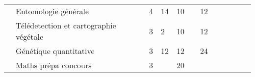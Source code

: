 \begin{tabular}{c|m{4.5cm}|cm{0.75cm}|cm{0.75cm}|cm{0.75cm}|cm{0.75cm}|cm{0.75cm}|}
 & \color{black} Entomologie générale & \color{black} 4 & \color{black} 14 & \color{black} 10 &  & \color{black} 12 
\\ 
\cline{2-7}
 & \cellcolor{couleurClaire} \color{couleurTexte} Télédetection et cartographie végétale & \cellcolor{couleurClaire} \color{couleurTexte} 3 & \cellcolor{couleurClaire} \color{couleurTexte} 2 & \cellcolor{couleurClaire} \color{couleurTexte} 10 &\cellcolor{couleurClaire} &\cellcolor{couleurClaire} \color{couleurTexte} 12 \\ \cline{2-7} 
 & \color{black} Génétique quantitative & \color{black} 3 & \color{black} 12 & \color{black} 12 & & \color{black} 24 
\\ 
\cline{2-7}
 & \cellcolor{couleurClaire} \color{couleurTexte} Maths prépa concours & \cellcolor{couleurClaire} \color{couleurTexte} 3 & \cellcolor{couleurClaire} & \cellcolor{couleurClaire} \color{couleurTexte} 20 & \cellcolor{couleurClaire} \color{couleurTexte}  &\cellcolor{couleurClaire} \color{couleurTexte} \\ 
\cline{1-7} 
\end{tabular}

